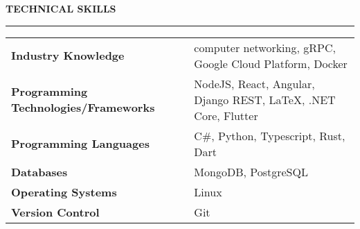 \noindent\textcolor{themecolor}{\textbf{TECHNICAL SKILLS}}

\vspace{2mm}
\hrule

\begin{table}[h]
\begin{tabular}{ >{\bfseries} l l }
    Industry Knowledge & computer networking, gRPC, Google Cloud Platform, Docker \\
    Programming Technologies/Frameworks & NodeJS, React, Angular, Django REST, \LaTeX, .NET Core, Flutter\\
    Programming Languages & C\#, Python, Typescript, Rust, Dart\\
    Databases & MongoDB, PostgreSQL\\
    Operating Systems & Linux\\
    Version Control & Git
\end{tabular}
\end{table}